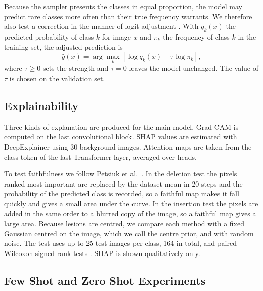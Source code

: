 \documentclass[runningheads]{llncs}
\begin{document}
Because the sampler presents the classes in equal proportion, the model may predict rare classes more often than their true frequency warrants. We therefore also test a correction in the manner of logit adjustment \cite{menon2021}. With $q_k(x)$ the predicted probability of class $k$ for image $x$ and $\pi_k$ the frequency of class $k$ in the training set, the adjusted prediction is
\begin{equation}
\hat{y}(x) = \arg\max_{k} \left[ \log q_k(x) + \tau \log \pi_k \right],
\label{eq:prior}
\end{equation}
where $\tau \ge 0$ sets the strength and $\tau = 0$ leaves the model unchanged. The value of $\tau$ is chosen on the validation set.

\subsection{Explainability}

Three kinds of explanation are produced for the main model. Grad-CAM \cite{selvaraju2017} is computed on the last convolutional block. SHAP values are estimated with DeepExplainer \cite{lundberg2017} using 30 background images. Attention maps are taken from the class token of the last Transformer layer, averaged over heads.

To test faithfulness we follow Petsiuk et al.\ \cite{petsiuk2018}. In the deletion test the pixels ranked most important are replaced by the dataset mean in 20 steps and the probability of the predicted class is recorded, so a faithful map makes it fall quickly and gives a small area under the curve. In the insertion test the pixels are added in the same order to a blurred copy of the image, so a faithful map gives a large area. Because lesions are centred, we compare each method with a fixed Gaussian centred on the image, which we call the centre prior, and with random noise. The test uses up to 25 test images per class, 164 in total, and paired Wilcoxon signed rank tests \cite{wilcoxon1945}. SHAP is shown qualitatively only.

\subsection{Few Shot and Zero Shot Experiments}
\end{document}
